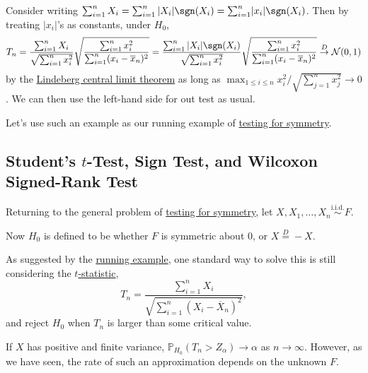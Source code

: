 \begin{eg}\label{eg:two-sample-t-statistic}
	Consider writing \(\sum_{i=1}^{n} X_i = \sum_{i=1}^{n} \vert X_i \vert \sgn (X_i) = \sum_{i=1}^{n} \lvert x_i \rvert \sgn (X_i)\). Then by treating \(\vert x_i \vert \)'s as constants, under \(H_0\),
	\begin{equation}\label{eq:two-sample}
		T_n
		= \frac{\sum_{i=1}^{n} X_i}{\sqrt{\sum_{i=1}^{n} x_i^2} } \sqrt{\frac{\sum_{i=1}^{n} x_i^2}{\sum_{i=1}^{n} (x_i - \overline{x} _n)^2}}
		= \frac{\sum_{i=1}^{n} \vert X_i \vert \sgn (X_i)}{\sqrt{\sum_{i=1}^{n} x_i^2} }\sqrt{\frac{\sum_{i=1}^{n} x_i^2}{\sum_{i=1}^{n} (x_i - \overline{x} _n)^2}}
		\overset{D}{\to} \mathcal{N} (0, 1)
	\end{equation}
	by the \hyperref[thm:Lindeberg-CLT]{Lindeberg central limit theorem} as long as \(\max _{1 \leq i \leq n} x_i^2 / \sqrt{\sum_{j=1}^{n} x_j^2} \to 0\). We can then use the left-hand side for out test as usual.
\end{eg}

Let's use such an example as our running example of \hyperref[prb:testing-symmetry]{testing for symmetry}.

\subsection{Student's \(t\)-Test, Sign Test, and Wilcoxon Signed-Rank Test}
Returning to the general problem of \hyperref[prb:testing-symmetry]{testing for symmetry}, let \(X, X_1, \dots , X_n \overset{\text{i.i.d.} }{\sim } F\).

\begin{prev}
	Now \(H_0\) is defined to be whether \(F\) is symmetric about \(0\), or \(X \overset{D}{=} -X\).
\end{prev}

As suggested by the \hyperref[eg:two-sample-t-statistic]{running example}, one standard way to solve this is still considering the \hyperref[def:t-statistic]{\(t\)-statistic},
\[
	T_n
	= \frac{\sum_{i=1}^{n} X_i}{\sqrt{\sum_{i=1}^{n} (X_i - \overline{X} _n)^2} },
\]
and reject \(H_0\) when \(T_n\) is larger than some critical value.

\begin{prev}
	If \(X\) has positive and finite variance, \(\mathbb{P} _{H_0}(T_n > Z_\alpha ) \to \alpha \) as \(n \to \infty \). However, as we have seen, the rate of such an approximation depends on the unknown \(F\).
\end{prev}

